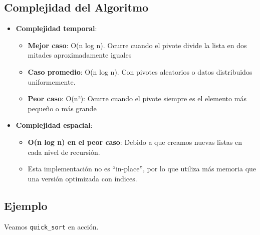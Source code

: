 \documentclass[
  spanish,
  letterpaper,
  DIV=11,
  numbers=noendperiod]{scrreprt}
\providecommand{\tightlist}{%
  \setlength{\itemsep}{0pt}\setlength{\parskip}{0pt}}
\begin{document}
\subsection{Complejidad del
Algoritmo}\label{complejidad-del-algoritmo-4}

\begin{itemize}
\tightlist
\item
  \textbf{Complejidad temporal}:

  \begin{itemize}
  \tightlist
  \item
    \textbf{Mejor caso}: O(n log n). Ocurre cuando el pivote divide la
    lista en dos mitades aproximadamente iguales
  \item
    \textbf{Caso promedio}: O(n log n). Con pivotes aleatorios o datos
    distribuidos uniformemente.
  \item
    \textbf{Peor caso}: O(n²): Ocurre cuando el pivote siempre es el
    elemento más pequeño o más grande
  \end{itemize}
\item
  \textbf{Complejidad espacial}:

  \begin{itemize}
  \tightlist
  \item
    \textbf{O(n log n) en el peor caso}: Debido a que creamos nuevas
    listas en cada nivel de recursión.
  \item
    Esta implementación no es ``in-place'', por lo que utiliza más
    memoria que una versión optimizada con índices.
  \end{itemize}
\end{itemize}

\subsection{Ejemplo}\label{ejemplo-6}

Veamos \texttt{quick\_sort} en acción.
\end{document}
